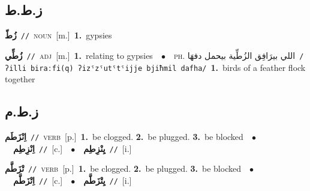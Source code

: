 \documentclass[10pt,a4paper,twoside]{article} %
\begin{document}
\begin{multicols}{2}
\vspace{-3mm}
\subsection*{\color{blue}\foreignlanguage{arabic}{ز.ط.ط}\color{blue}{}} 

{\setlength\topsep{0pt}\textbf{\foreignlanguage{arabic}{زُطّ}}\ {\color{gray}\texttt{//}\color{black}}\ \textsc{noun}\ [m.]\ \textbf{1.}~gypsies\ } \vspace{2mm}

{\setlength\topsep{0pt}\textbf{\foreignlanguage{arabic}{زُطِّي}}\ {\color{gray}\texttt{//}\color{black}}\ \textsc{adj}\ [m.]\ \textbf{1.}~relating to gypsies\ \ $\bullet$\ \ \textsc{ph.} \color{gray} \foreignlanguage{arabic}{اللي بيرَافِق الزُطِّية بيحمل دفهَا}\color{black}\ {\color{gray}\texttt{/{\sffamily ʔilli biraːfi(q) ʔizˤzˤutˤtˤijje bjiħmil dafha}/}\color{black}}\ \textbf{1.}~birds of a feather flock together\ } \vspace{2mm}

\vspace{-3mm}
\subsection*{\color{blue}\foreignlanguage{arabic}{ز.ط.م}\color{blue}{}} 

{\setlength\topsep{0pt}\textbf{\foreignlanguage{arabic}{اِنْزَطَم}}\ {\color{gray}\texttt{//}\color{black}}\ \textsc{verb}\ [p.]\ \textbf{1.}~be clogged.  \textbf{2.}~be plugged.  \textbf{3.}~be blocked\ \ $\bullet$\ \ \setlength\topsep{0pt}\textbf{\foreignlanguage{arabic}{اِنْزِطِم}}\ {\color{gray}\texttt{//}\color{black}}\ [c.]\ \ $\bullet$\ \ \setlength\topsep{0pt}\textbf{\foreignlanguage{arabic}{يِنْزِطِم}}\ {\color{gray}\texttt{//}\color{black}}\ [i.]\ } \vspace{2mm}

{\setlength\topsep{0pt}\textbf{\foreignlanguage{arabic}{تْزَطَّم}}\ {\color{gray}\texttt{//}\color{black}}\ \textsc{verb}\ [p.]\ \textbf{1.}~be clogged.  \textbf{2.}~be plugged.  \textbf{3.}~be blocked\ \ $\bullet$\ \ \setlength\topsep{0pt}\textbf{\foreignlanguage{arabic}{اِتْزَطَّم}}\ {\color{gray}\texttt{//}\color{black}}\ [c.]\ \ $\bullet$\ \ \setlength\topsep{0pt}\textbf{\foreignlanguage{arabic}{يِتْزَطَّم}}\ {\color{gray}\texttt{//}\color{black}}\ [i.]\ } \vspace{2mm}


\end{multicols}
\end{document}
